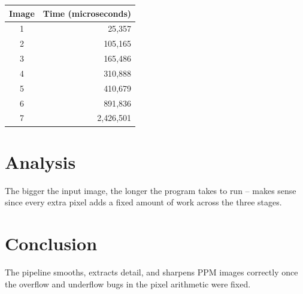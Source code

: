 \documentclass[11pt]{article}
\begin{document}
\begin{table}[h]
	\centering
	\begin{tabular}{cr}
		\toprule
		Image & Time (microseconds) \\
		\midrule
		1 & 25{,}357 \\
		2 & 105{,}165 \\
		3 & 165{,}486 \\
		4 & 310{,}888 \\
		5 & 410{,}679 \\
		6 & 891{,}836 \\
		7 & 2{,}426{,}501 \\
		\bottomrule
	\end{tabular}
\end{table}

\section*{Analysis}
The bigger the input image, the longer the program takes to run -- makes sense
since every extra pixel adds a fixed amount of work across the three stages.

\section*{Conclusion}
The pipeline smooths, extracts detail, and sharpens PPM images correctly once the
overflow and underflow bugs in the pixel arithmetic were fixed.
\end{document}
